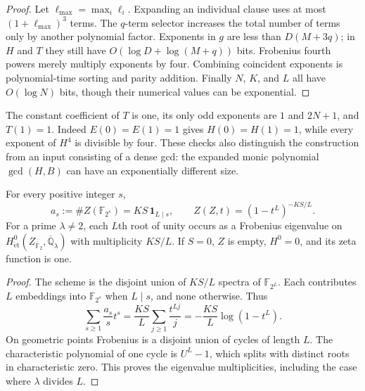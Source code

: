 \begin{proof}
Let $\ell_{\max}=\max_i\ell_i$. Expanding an individual clause uses at most $(1+\ell_{\max})^3$ terms. The $q$-term selector increases the total number of terms only by another polynomial factor. Exponents in $g$ are less than $D(M+3q)$; in $H$ and $T$ they still have $O(\log D+\log(M+q))$ bits. Frobenius fourth powers merely multiply exponents by four. Combining coincident exponents is polynomial-time sorting and parity addition. Finally $N$, $K$, and $L$ all have $O(\log N)$ bits, though their numerical values can be exponential.
\end{proof}

The constant coefficient of $T$ is one, its only odd exponents are $1$ and $2N+1$, and $T(1)=1$. Indeed $E(0)=E(1)=1$ gives $H(0)=H(1)=1$, while every exponent of $H^4$ is divisible by four. These checks also distinguish the construction from an input consisting of a dense gcd: the expanded monic polynomial $\gcd(H,B)$ can have an exponentially different size.

\begin{corollary}\label{cor:ff-zeta}
For every positive integer $s$,
\[
 a_s:=\#Z(\mathbb F_{2^s})=KS\,\mathbf 1_{L\mid s},
 \qquad
 Z(Z,t)=(1-t^L)^{-KS/L}.
\]
For a prime $\lambda\neq2$, each $L$th root of unity occurs as a Frobenius eigenvalue on $H^0_{\mathrm{\acute et}}(Z_{\overline{\mathbb F}_2},\overline{\mathbb Q}_\lambda)$ with multiplicity $KS/L$. If $S=0$, $Z$ is empty, $H^0=0$, and its zeta function is one.
\end{corollary}
\begin{proof}
The scheme is the disjoint union of $KS/L$ spectra of $\mathbb F_{2^L}$. Each contributes $L$ embeddings into $\mathbb F_{2^s}$ when $L\mid s$, and none otherwise. Thus
\[
 \sum_{s\geq1}\frac{a_s}{s}t^s
  =\frac{KS}{L}\sum_{j\geq1}\frac{t^{Lj}}j
  =-\frac{KS}{L}\log(1-t^L).
\]
On geometric points Frobenius is a disjoint union of cycles of length $L$. The characteristic polynomial of one cycle is $U^L-1$, which splits with distinct roots in characteristic zero. This proves the eigenvalue multiplicities, including the case where $\lambda$ divides $L$.
\end{proof}


